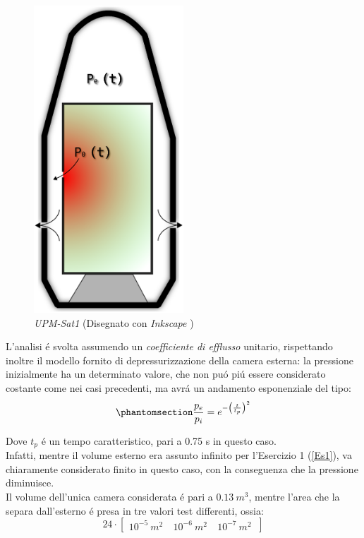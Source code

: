 \documentclass{article}
\begin{document}
        \begin{figure}[h!]
            \centering
            \label{fig:MUL2_stdout}
            \includegraphics[width=0.5\textwidth]{MUL2/Esercitazione1/2A/Esercizio_2.eps}
            \caption{\textit{UPM-Sat1} (Disegnato con \textit{Inkscape} \autocite{Inkscape})}
        \end{figure}

        L'analisi é svolta assumendo un \textit{coefficiente di efflusso} unitario,
        rispettando inoltre il modello fornito di depressurizzazione della camera esterna: la pressione
        inizialmente ha un determinato valore, che non puó piú essere considerato costante come nei casi precedenti, ma avrá un andamento 
        esponenziale del tipo: \\
        \begin{equation}
            \phantomsection
            \label{equation_press_exp}
            \frac{p_e}{p_i} = e^{-\left ({\frac{t}{t_p}}  \right )^2}
        \end{equation}

        Dove $t_p$ é un tempo caratteristico, pari a 0.75 s in questo caso.
        \\ 
        \linebreak
        Infatti, mentre il volume esterno era assunto infinito per l'Esercizio 1 (\ref{Es1}), va chiaramente considerato
        finito in questo caso, con la conseguenza che la pressione diminuisce.
        \\ 
        \linebreak
        Il volume dell'unica camera considerata é pari a $0.13 \ m^3$, mentre 
        l'area che la separa dall'esterno é presa in tre valori test differenti, ossia:
        \[24 \cdot \begin{bmatrix}
            10^{-5}\ m^2\ & 10^{-6}\ m^2\ & 10^{-7} \ m^2\
            \end{bmatrix}\]
        \clearpage
\end{document}
